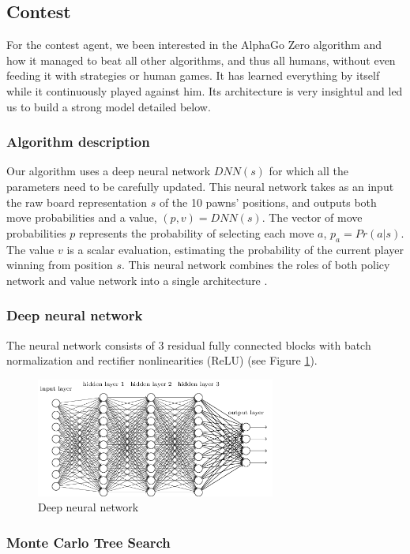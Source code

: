 \documentclass[journal,onecolumn]{IEEEtran}
\begin{document}
\subsection{Contest}
For the contest agent, we been interested in the AlphaGo Zero algorithm and how it managed to beat all other algorithms, and thus all humans, without even feeding it with strategies or human games. It has learned everything by itself while it continuously played against him. Its architecture is very insightul and led us to build a strong model detailed below.

\subsubsection*{Algorithm description}
Our algorithm uses a deep neural network $DNN(s)$ for which all the parameters need to be carefully updated. This neural network takes as an input the raw board representation $s$ of the 10 pawns' positions, and outputs both move probabilities and a value, $(p, v) = DNN(s)$.
The vector of move probabilities $p$ represents the probability of selecting each move $a$, $p_a = Pr(a|s)$. The value $v$ is a scalar evaluation, estimating the probability of the current player winning from position $s$. This neural network combines the roles of both policy network and value network into a single architecture \cite{alphago}. 

\subsubsection*{Deep neural network}
The neural network consists of 3 residual fully connected blocks with batch normalization and rectifier nonlinearities (ReLU) (see Figure \ref{fig:DNN}). 

\begin{figure}[H]
    \centering
    \includegraphics[width=0.7\textwidth]{img/dnn.png}
    \caption{Deep neural network}
    \label{fig:DNN}
\end{figure}

\subsubsection*{Monte Carlo Tree Search}
\end{document}
